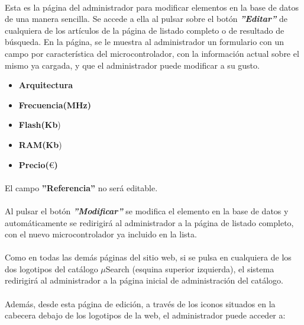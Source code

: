 \paragraph{} Esta es la página del administrador para modificar elementos en la base de datos de una manera sencilla. Se accede a ella al pulsar sobre el botón \textbf{\textit{''Editar''}} de cualquiera de los artículos de la página de listado completo o de resultado de búsqueda. En la página, se le muestra al administrador un formulario con un campo por característica del microcontrolador, con la información actual sobre el mismo ya cargada, y que el administrador puede modificar a su gusto.
\begin{itemize}
\item \textbf{Arquitectura}
\item \textbf{Frecuencia(MHz)}
\item \textbf{Flash(Kb})
\item \textbf{RAM(Kb}) 
\item \textbf{Precio($\euro$)}
\end{itemize}

\paragraph{} El campo \textbf{''Referencia''} no será editable.

\paragraph{} Al pulsar el botón \textbf{\textit{''Modificar''}} se modifica el elemento en la base de datos y automáticamente se redirigirá al administrador a la página de listado completo, con el nuevo microcontrolador ya incluido en la lista.

\paragraph{}Como en todas las demás páginas del sitio web, si se pulsa en cualquiera de los dos logotipos del catálogo $\mu$Search (esquina superior izquierda), el sistema redirigirá al administrador a la página inicial de administración del catálogo.

\paragraph{}Además, desde esta página de edición, a través de los iconos situados en la cabecera debajo de los logotipos de la web, el administrador puede acceder a:

